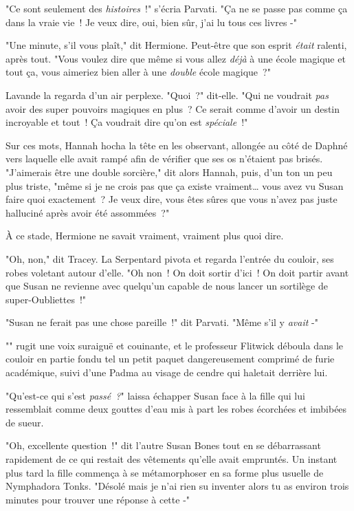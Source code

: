 "Ce sont seulement des \emph{histoires}~!" s'écria Parvati. "Ça ne se passe pas comme ça dans la vraie vie~! Je veux dire, oui, bien sûr, j'ai lu tous ces livres -"

"Une minute, s'il vous plaît," dit Hermione. Peut-être que son esprit \emph{était} ralenti, après tout. "Vous voulez dire que même si vous allez \emph{déjà} à une école magique et tout ça, vous aimeriez bien aller à une \emph{double} école magique~?"

Lavande la regarda d'un air perplexe. "Quoi~?" dit-elle. "Qui ne voudrait \emph{pas} avoir des super pouvoirs magiques en plus~? Ce serait comme d'avoir un destin incroyable et tout~! Ça voudrait dire qu'on est \emph{spéciale}~!"

Sur ces mots, Hannah hocha la tête en les observant, allongée au côté de Daphné vers laquelle elle avait rampé afin de vérifier que ses os n'étaient pas brisés. "J'aimerais être une double sorcière," dit alors Hannah, puis, d'un ton un peu plus triste, "même si je ne crois pas que ça existe vraiment… vous avez vu Susan faire quoi exactement~? Je veux dire, vous êtes sûres que vous n'avez pas juste halluciné après avoir été assommées~?"

À ce stade, Hermione ne savait vraiment, vraiment plus quoi dire.

"Oh, non," dit Tracey. La Serpentard pivota et regarda l'entrée du couloir, ses robes voletant autour d'elle. "Oh non~! On doit sortir d'ici~! On doit partir avant que Susan ne revienne avec quelqu'un capable de nous lancer un sortilège de super-Oubliettes~!"

"Susan ne ferait pas une chose pareille~!" dit Parvati. "Même s'il y \emph{avait} -"

"" rugit une voix suraiguë et couinante, et le professeur Flitwick déboula dans le couloir en partie fondu tel un petit paquet dangereusement comprimé de furie académique, suivi d'une Padma au visage de cendre qui haletait derrière lui.

\later

"Qu'est-ce qui s'est \emph{passé~?}" laissa échapper Susan face à la fille qui lui ressemblait comme deux gouttes d'eau mis à part les robes écorchées et imbibées de sueur.

"Oh, excellente question~!" dit l'autre Susan Bones tout en se débarrassant rapidement de ce qui restait des vêtements qu'elle avait empruntés. Un instant plus tard la fille commença à se métamorphoser en sa forme plus usuelle de Nymphadora Tonks. "Désolé mais je n'ai rien su inventer alors tu as environ trois minutes pour trouver une réponse à cette -"

